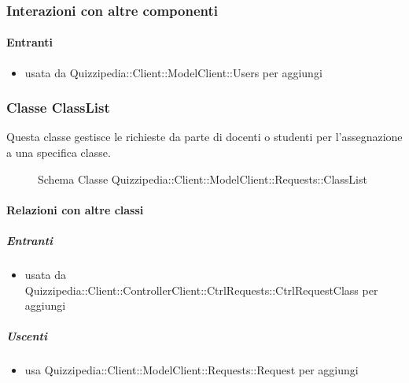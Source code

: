 \subsubsection{Interazioni con altre componenti}
\paragraph{Entranti}
\begin{itemize}
\item usata da Quizzipedia::Client::ModelClient::Users per aggiungi
\end{itemize}
\subsubsection{Classe ClassList}
Questa classe gestisce le richieste da parte di docenti o studenti per l'assegnazione a una specifica classe.
\begin{figure}[H]
\centering
\noindent{}
\caption[Schema Classe ClassList]{Schema Classe Quizzipedia::Client::ModelClient::Requests::ClassList}
\end{figure}
\paragraph{Relazioni con altre classi}
\subparagraph{Entranti}
\begin{itemize}
\item usata da Quizzipedia::Client::ControllerClient::CtrlRequests::CtrlRequestClass per aggiungi
\end{itemize}
\subparagraph{Uscenti}
\begin{itemize}
\item usa Quizzipedia::Client::ModelClient::Requests::Request per aggiungi
\end{itemize}
